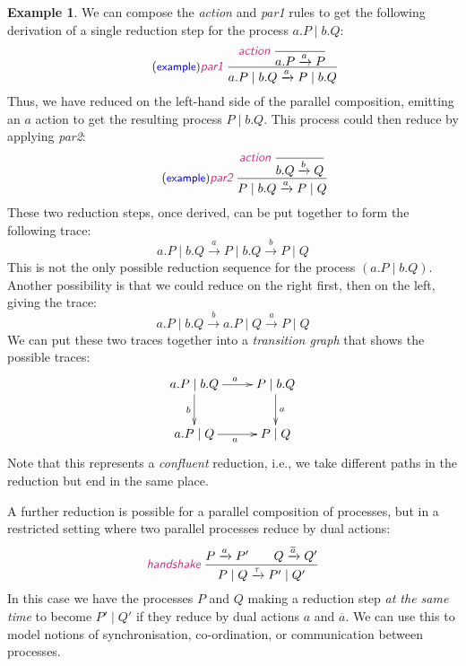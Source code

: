 \documentclass{article}
\newcommand{\exampleLabel}{\tag{\small{\textcolor{blue}{\textsf{example}}}}}
\theoremstyle{definition}
\newtheorem{example}{Example}
\newcommand{\trule}[1]{\textcolor{labelColor}{\textit{\textsf{#1}}}\;}
\begin{document}
\begin{example}
We can compose the \trule{action} and \trule{par1}
rules to get the following derivation of a single reduction
step for the process $a . P \mid b . Q$:
%
\begin{align*}
  \exampleLabel{}
  \trule{par1}\dfrac{\trule{action}
  \dfrac{}{a.P \xrightarrow{a} P}}{a.P \mid b.Q \xrightarrow{a} P \mid b.Q}
\end{align*}
%
Thus, we have reduced on the left-hand side of the parallel
composition, emitting an $a$ action to get the resulting process $P
\mid b . Q$. This process could then reduce by applying \trule{par2}:
%
\begin{align*}
  \exampleLabel{}
  \trule{par2}\dfrac{\trule{action}
   \dfrac{}{b.Q \xrightarrow{b} Q}}{P \mid b.Q \xrightarrow{a} P \mid Q}
\end{align*}
%
These two reduction steps, once derived, can be put together to form
the following trace:
%
\begin{equation*}
a.P \mid b.Q \xrightarrow{a} P \mid b.Q \xrightarrow{b} P \mid Q
\end{equation*}
%
This is not the only possible reduction sequence for
the process $(a.P \mid b.Q)$. Another possibility is that we could
reduce on the right first, then on the left, giving the trace:
%
\begin{equation*}
a.P \mid b.Q \xrightarrow{b} a.P \mid Q \xrightarrow{a} P \mid Q
\end{equation*}
%
We can put these two traces together into a \emph{transition graph} that shows
the possible traces:
%
\begin{equation*}
  \xymatrix{
    a.P \mid b.Q \ar[r]^{a} \ar[d]_-{b} & P \mid b.Q \ar[d]^-{a} \\
    a.P \mid Q \ar[r]_{a} & P \mid Q
    }
\end{equation*}
%
Note that this represents a \emph{confluent} reduction, i.e., we take
different paths in the reduction but end in the same place.
\end{example}

A further reduction is possible for a parallel composition of processes,
but in a restricted setting where two parallel processes reduce
by dual actions:
%
\begin{align*}
  \trule{handshake}\dfrac{P \xrightarrow{a} P' \qquad Q \xrightarrow{\overline{a}} Q'}
  {P \mid Q \xrightarrow{\tau} P' \mid Q'}
\end{align*}
%
In this case we have the processes $P$ and $Q$ making a reduction step
\emph{at the same time} to become $P' \mid Q'$ if they reduce by dual
actions $a$ and $\overline{a}$. We can use this to model notions of
synchronisation, co-ordination, or communication between processes.
\end{document}
